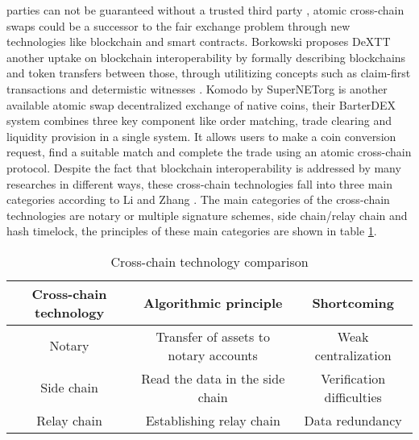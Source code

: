 parties can not be guaranteed without a trusted third party \cite{pagnia1999impossibility}, atomic cross-chain swaps could be a successor to the fair exchange problem through new technologies like blockchain and smart contracts. Borkowski proposes \ac{DeXTT} another uptake on blockchain interoperability by formally describing blockchains and token transfers between those, through utilitizing concepts such as claim-first transactions and determistic witnesses \cite{borkowski2019dextt}. Komodo \cite{barterdex2020} by SuperNETorg is another available atomic swap decentralized exchange of native coins, their BarterDEX system combines three key component like order matching, trade clearing and liquidity provision in a single system. It allows users to make a coin conversion request, find a suitable match and complete the trade using an atomic cross-chain protocol. Despite the fact that blockchain interoperability is addressed by many researches in different ways, these cross-chain technologies fall into three main categories according to Li and Zhang \cite{li2019research}. The main categories of the cross-chain technologies are notary or multiple signature schemes, side chain/relay chain and hash timelock, the principles of these main categories are shown in table \ref{table:1}. \newline

\begin{table}[h!]
	\centering
	\begin{tabular}{|c | c | c |} 
		\hline 
		Cross-chain technology & Algorithmic principle & Shortcoming \\ [0.5ex] 
		\hline \hline
		Notary & Transfer of assets to notary accounts & Weak centralization  \\ 
		\hline
		Side chain & Read the data in the side chain & Verification difficulties  \\
		\hline
		Relay chain & Establishing relay chain & Data redundancy  \\ [1ex] 
		\hline
	\end{tabular}
	\caption{Cross-chain technology comparison}
	\label{table:1}
\end{table}

